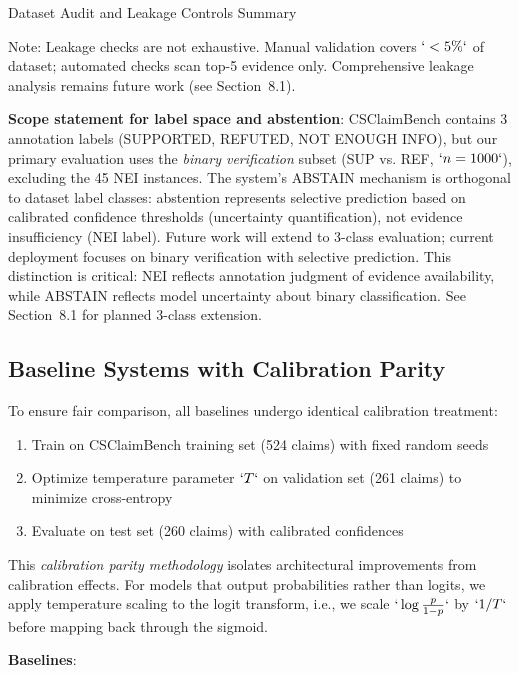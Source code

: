 Dataset Audit and Leakage Controls Summary

Note: Leakage checks are not exhaustive. Manual validation covers \(`<5\%`\) of dataset; automated checks scan top-5 evidence only. Comprehensive leakage analysis remains future work (see Section~8.1).

\textbf{Scope statement for label space and abstention}: \protect{}\label{sec:label_scope}{} CSClaimBench contains 3 annotation labels (SUPPORTED, REFUTED, NOT ENOUGH INFO), but our primary evaluation uses the \emph{binary verification} subset (SUP vs. REF, \(`n=1000`\)), excluding the 45 NEI instances. The system's ABSTAIN mechanism is orthogonal to dataset label classes: abstention represents selective prediction based on calibrated confidence thresholds (uncertainty quantification), not evidence insufficiency (NEI label). Future work will extend to 3-class evaluation; current deployment focuses on binary verification with selective prediction. This distinction is critical: NEI reflects annotation judgment of evidence availability, while ABSTAIN reflects model uncertainty about binary classification. See Section~8.1 for planned 3-class extension.

\subsection{Baseline Systems with Calibration Parity}\label{baseline-systems-with-calibration-parity}

To ensure fair comparison, all baselines undergo identical calibration treatment:

\begin{enumerate}
\def\labelenumi{\arabic{enumi}.}
\item
  Train on CSClaimBench training set (524 claims) with fixed random seeds
\item
  Optimize temperature parameter \(`T`\) on validation set (261 claims) to minimize cross-entropy
\item
  Evaluate on test set (260 claims) with calibrated confidences
\end{enumerate}

This \emph{calibration parity methodology} isolates architectural improvements from calibration effects. For models that output probabilities rather than logits, we apply temperature scaling to the logit transform, i.e., we scale \(`\log\frac{p}{1-p}`\) by \(`1/T`\) before mapping back through the sigmoid.

\textbf{Baselines}:

